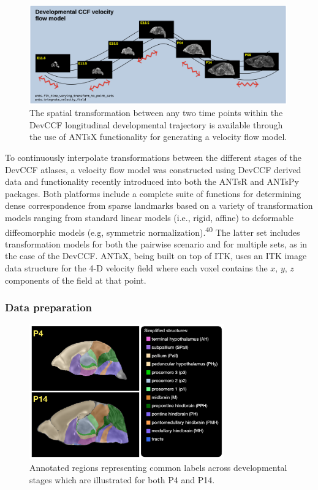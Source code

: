 \documentclass[
  12pt,
]{article}
\begin{document}
\begin{figure}
\centering
\includegraphics[width=0.99\textwidth]{Figures/lowerLeftPanel.png}
\caption{The spatial transformation between any two
time points within the DevCCF longitudinal developmental trajectory
is available through the use of ANTsX functionality for generating
a velocity flow model.}
\label{fig:devccfvelocity}
\end{figure}

To continuously interpolate transformations between the different stages
of the DevCCF atlases, a velocity flow model was constructed using
DevCCF derived data and functionality recently introduced into both the
ANTsR and ANTsPy packages. Both platforms include a complete suite of
functions for determining dense correspondence from sparse landmarks
based on a variety of transformation models ranging from standard linear
models (i.e., rigid, affine) to deformable diffeomorphic models (e.g,
symmetric normalization).\textsuperscript{40} The latter set includes
transformation models for both the pairwise scenario and for multiple
sets, as in the case of the DevCCF. ANTsX, being built on top of ITK,
uses an ITK image data structure for the 4-D velocity field where each
voxel contains the \(x\), \(y\), \(z\) components of the field at that
point.

\hypertarget{data-preparation}{%
\subsubsection{Data preparation}\label{data-preparation}}

\begin{figure}[!htb]
\centering
\includegraphics[width=0.75\textwidth]{Figures/SimplifiedAnnotations.pdf}
\caption{Annotated regions representing common labels across developmental stages which
are illustrated for both P4 and P14.}
\label{fig:simplifiedannotations}
\end{figure}
\end{document}
